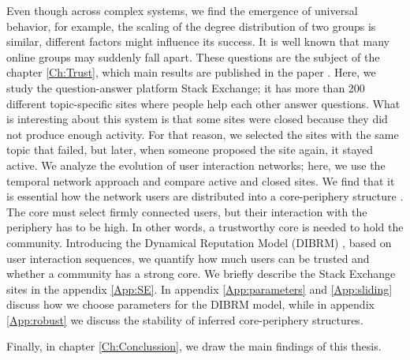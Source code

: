 Even though across complex systems, we find the emergence of universal behavior, for example, the scaling of the degree distribution of two groups is similar, different factors might influence its success. It is well known that many online groups may suddenly fall apart. These questions are the subject of the chapter \ref{Ch:Trust}, which main results are published in the paper \cite{vranic2022sustainability}. Here, we study the question-answer platform Stack Exchange; it has more than 200 different topic-specific sites where people help each other answer questions. What is interesting about this system is that some sites were closed because they did not produce enough activity. For that reason, we selected the sites with the same topic that failed, but later, when someone proposed the site again, it stayed active. We analyze the evolution of user interaction networks; here, we use the temporal network approach and compare active and closed sites. We find that it is essential how the network users are distributed into a core-periphery structure \cite{gallagher2020clarified}. The core must select firmly connected users, but their interaction with the periphery has to be high. In other words, a trustworthy core is needed to hold the community. Introducing the Dynamical Reputation Model (DIBRM) \cite{melnikov2018toward}, based on user interaction sequences, we quantify how much users can be trusted and whether a community has a strong core. We briefly describe the Stack Exchange sites in the appendix \ref{App:SE}. In appendix \ref{App:parameters} and \ref{App:sliding} discuss how we choose parameters for the DIBRM model, while in appendix \ref{App:robust} we discuss the stability of inferred core-periphery structures. 

Finally, in chapter \ref{Ch:Conclussion}, we draw the main findings of this thesis. 















